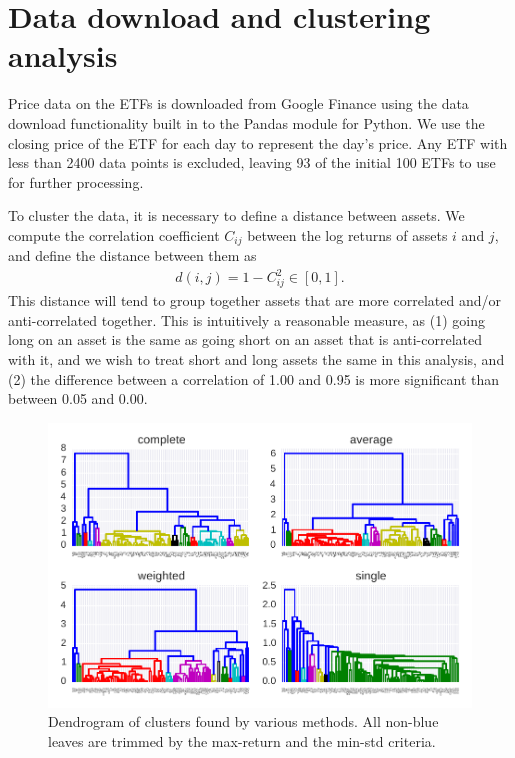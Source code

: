 \section{Data download and clustering analysis}

Price data on the ETFs is downloaded from Google Finance using the data download functionality built in to the Pandas module for Python.
We use the closing price of the ETF for each day to represent the day's price.
Any ETF with less than 2400 data points is excluded, leaving 93 of the initial 100 ETFs to use for further processing.

To cluster the data, it is necessary to define a distance between assets. We compute the correlation coefficient $C_{ij}$ between the log returns of assets $i$ and $j$, and define the distance between them as
\begin{gather}
d(i,j) = 1 - C_{ij}^2  \in [0, 1].
\end{gather}
This distance will tend to group together assets that are more correlated and/or anti-correlated together.
This is intuitively a reasonable measure, as (1) going long on an asset is the same as going short on an asset that is anti-correlated with it, and we wish to treat short and long assets the same in this analysis, and (2) the difference between a correlation of 1.00 and 0.95 is more significant than between 0.05 and 0.00.

\begin{figure}[tp]
\centering
\includegraphics[width=1.0\textwidth]{../pic/dendro_methods.pdf}
\caption{Dendrogram of clusters found by various methods. All non-blue leaves are trimmed by the max-return and the min-std criteria.}
\label{fig:dendrogram}
\end{figure}

